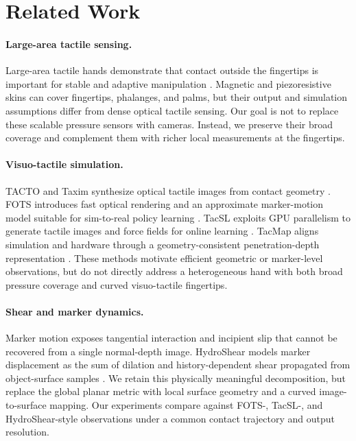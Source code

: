 \documentclass[10pt,twocolumn]{article}
\begin{document}
\section{Related Work}
\label{sec:related_work}

\paragraph{Large-area tactile sensing.}
Large-area tactile hands demonstrate that contact outside the fingertips is
important for stable and adaptive manipulation
\cite{melcer2024feels,yin2023touchdexterity,althoefer2024sensorizedskin}.
Magnetic and piezoresistive skins can cover fingertips, phalanges, and palms,
but their output and simulation assumptions differ from dense optical tactile
sensing.  Our goal is not to replace these scalable pressure sensors with
cameras.  Instead, we preserve their broad coverage and complement them with
richer local measurements at the fingertips.

\paragraph{Visuo-tactile simulation.}
TACTO and Taxim synthesize optical tactile images from contact geometry
\cite{wang2022tacto,si2022taxim}.  FOTS introduces fast optical rendering and an
approximate marker-motion model suitable for sim-to-real policy learning
\cite{zhao2024fots}.  TacSL exploits GPU parallelism to generate tactile images
and force fields for online learning \cite{akinola2024tacsl}.  TacMap aligns
simulation and hardware through a geometry-consistent penetration-depth
representation \cite{su2026tacmap}.  These methods motivate efficient geometric
or marker-level observations, but do not directly address a heterogeneous hand
with both broad pressure coverage and curved visuo-tactile fingertips.

\paragraph{Shear and marker dynamics.}
Marker motion exposes tangential interaction and incipient slip that cannot be
recovered from a single normal-depth image.  HydroShear models marker
displacement as the sum of dilation and history-dependent shear propagated from
object-surface samples \cite{hydroshear2026}.  We retain this physically
meaningful decomposition, but replace the global planar metric with local
surface geometry and a curved image-to-surface mapping.  Our experiments
compare against FOTS-, TacSL-, and HydroShear-style observations under a common
contact trajectory and output resolution.
\end{document}

